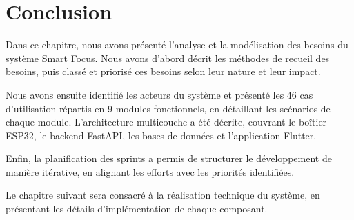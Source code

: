 \documentclass[12pt,a4paper]{report}
\begin{document}
\section*{Conclusion}

Dans ce chapitre, nous avons présenté l'analyse et la modélisation des besoins du système Smart Focus. Nous avons d'abord décrit les méthodes de recueil des besoins, puis classé et priorisé ces besoins selon leur nature et leur impact.

Nous avons ensuite identifié les acteurs du système et présenté les 46 cas d'utilisation répartis en 9 modules fonctionnels, en détaillant les scénarios de chaque module. L'architecture multicouche a été décrite, couvrant le boîtier ESP32, le backend FastAPI, les bases de données et l'application Flutter.

Enfin, la planification des sprints a permis de structurer le développement de manière itérative, en alignant les efforts avec les priorités identifiées.

Le chapitre suivant sera consacré à la réalisation technique du système, en présentant les détails d'implémentation de chaque composant.
\end{document}
